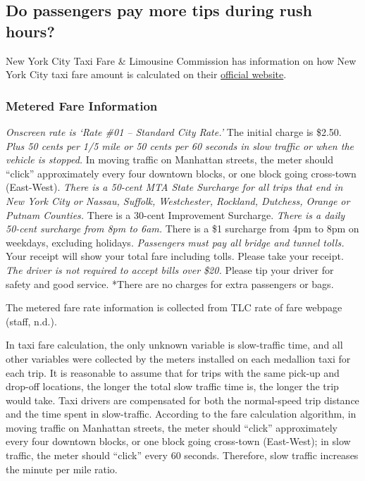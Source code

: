 \documentclass[12pt,twoside]{reedthesis}
\theoremstyle{definition}
\theoremstyle{definition}
\theoremstyle{definition}
\theoremstyle{remark}
\begin{document}
\subsection{Do passengers pay more tips during rush
hours?}\label{do-passengers-pay-more-tips-during-rush-hours}

New York City Taxi Fare \& Limousine Commission has information on how
New York City taxi fare amount is calculated on their
\href{http://www.nyc.gov/html/tlc/html/passenger/taxicab_rate.shtml}{official
website}.

\subsubsection{Metered Fare Information}\label{metered-fare-information}

\emph{Onscreen rate is `Rate \#01 -- Standard City Rate.' }The initial
charge is \$2.50. \emph{Plus 50 cents per 1/5 mile or 50 cents per 60
seconds in slow traffic or when the vehicle is stopped. }In moving
traffic on Manhattan streets, the meter should ``click'' approximately
every four downtown blocks, or one block going cross-town (East-West).
\emph{There is a 50-cent MTA State Surcharge for all trips that end in
New York City or Nassau, Suffolk, Westchester, Rockland, Dutchess,
Orange or Putnam Counties. }There is a 30-cent Improvement Surcharge.
\emph{There is a daily 50-cent surcharge from 8pm to 6am. }There is a
\$1 surcharge from 4pm to 8pm on weekdays, excluding holidays.
\emph{Passengers must pay all bridge and tunnel tolls. }Your receipt
will show your total fare including tolls. Please take your receipt.
\emph{The driver is not required to accept bills over \$20. }Please tip
your driver for safety and good service. *There are no charges for extra
passengers or bags.

The metered fare rate information is collected from TLC rate of fare
webpage (staff, n.d.).

In taxi fare calculation, the only unknown variable is slow-traffic
time, and all other variables were collected by the meters installed on
each medallion taxi for each trip. It is reasonable to assume that for
trips with the same pick-up and drop-off locations, the longer the total
slow traffic time is, the longer the trip would take. Taxi drivers are
compensated for both the normal-speed trip distance and the time spent
in slow-traffic. According to the fare calculation algorithm, in moving
traffic on Manhattan streets, the meter should ``click'' approximately
every four downtown blocks, or one block going cross-town (East-West);
in slow traffic, the meter should ``click'' every 60 seconds. Therefore,
slow traffic increases the minute per mile ratio.
\end{document}
